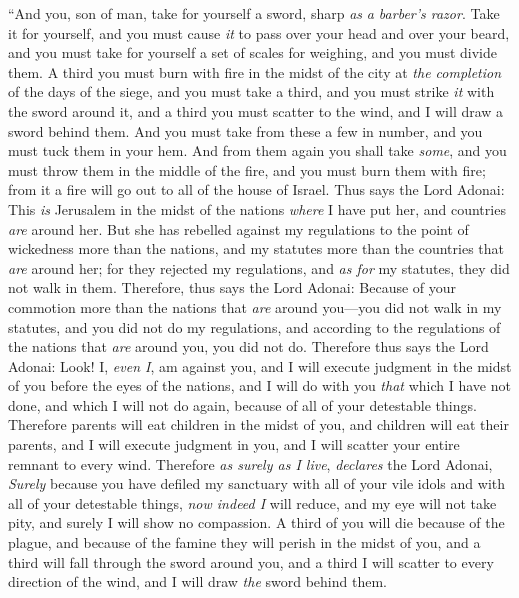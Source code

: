 \begin{biblechapter} %
\verse “And you, son of man, take for yourself a sword, sharp \textit{as} \textit{a barber’s razor}. Take it for yourself, and you must cause \textit{it} to pass over your head and over your beard, and you must take for yourself a set of scales for weighing, and you must divide them.
\verse A third you must burn with fire in the midst of the city at \textit{the completion} of the days of the siege, and you must take a third, and you must strike \textit{it} with the sword around it, and a third you must scatter to the wind, and I will draw a sword behind them.
\verse And you must take from these a few in number, and you must tuck them in your hem.
\verse And from them again you shall take \textit{some}, and you must throw them in the middle of the fire, and you must burn them with fire; from it a fire will go out to all of the house of Israel.
\verse Thus says the Lord Adonai: This \textit{is} Jerusalem in the midst of the nations \textit{where} I have put her, and countries \textit{are} around her.
\verse But she has rebelled against my regulations to the point of wickedness more than the nations, and my statutes more than the countries that \textit{are} around her; for they rejected my regulations, and \textit{as for} my statutes, they did not walk in them.
\verse Therefore, thus says the Lord Adonai: Because of your commotion more than the nations that \textit{are} around you—you did not walk in my statutes, and you did not do my regulations, and according to the regulations of the nations that \textit{are} around you, you did not do.
\verse Therefore thus says the Lord Adonai: Look! I, \textit{even I}, am against you, and I will execute judgment in the midst of you before the eyes of the nations,
\verse and I will do with you \textit{that} which I have not done, and which I will not do again, because of all of your detestable things.
\verse Therefore parents will eat children in the midst of you, and children will eat their parents, and I will execute judgment in you, and I will scatter your entire remnant to every wind.
\verse Therefore \textit{as surely as I live}, \textit{declares} the Lord Adonai, \textit{Surely} because you have defiled my sanctuary with all of your vile idols and with all of your detestable things, \textit{now indeed I} will reduce, and my eye will not take pity, and surely I will show no compassion.
\verse A third of you will die because of the plague, and because of the famine they will perish in the midst of you, and a third will fall through the sword around you, and a third I will scatter to every direction of the wind, and I will draw \textit{the} sword behind them.

\end{biblechapter}
